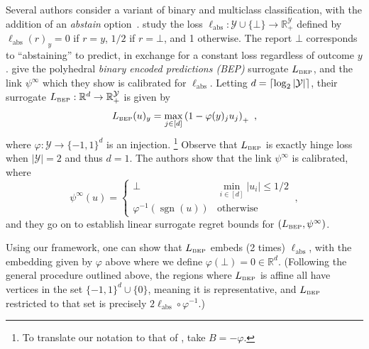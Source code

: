 \documentclass[twoside,11pt]{article}
\newcommand{\reals}{\mathbb{R}}
\newcommand{\BEP}{L_{\text{\tiny BEP}}}
\newcommand{\ellabstain}{\ell_{\text{abs}}}
\newcommand{\Y}{\mathcal{Y}}
\DeclarePairedDelimiter\ceil{\lceil}{\rceil}
\DeclareMathOperator*{\sgn}{sgn}
\begin{document}
Several authors consider a variant of binary and multiclass classification, with the addition of an \emph{abstain} option~\citep{bartlett2008classification,ramaswamy2018consistent,madras2018predict,elyaniv2010foundations,cortes2016learning}.
\citet{ramaswamy2018consistent} study the loss $\ellabstain: \Y \cup \{\bot\} \to \reals^\Y_+$ defined by $\ellabstain(r)_y = 0$ if $r=y$, $1/2$ if $r = \bot$, and 1 otherwise.
The report $\bot$ corresponds to ``abstaining'' to predict, in exchange for a constant loss regardless of outcome $y$. 
\citeauthor{ramaswamy2018consistent} give the polyhedral \emph{binary encoded predictions (BEP)} surrogate $\BEP$, and the link $\psi^\infty$ which they show is calibrated for $\ellabstain$.
Letting $d = \ceil{\log_2 |\Y|}$, their surrogate $\BEP : \reals^d \to \reals^\Y_+$ is given by
\begin{equation}\label{eq:abstain-surrogate}
\BEP(u)_y = \max_{j \in [d]} \left(1 - \varphi(y)_j u_j\right)_+~,
\end{equation}
where $\varphi:\Y\to\{-1,1\}^d$ is an injection.%
\footnote{To translate our notation to that of \citet{ramaswamy2018consistent}, take $B = -\varphi$.}
Observe that $\BEP$ is exactly hinge loss when $|\Y|=2$ and thus $d=1$. 
The authors show that the link $\psi^{\infty}$ is calibrated, where
\begin{equation}\label{eq:abstain-link}
  \psi^{\infty}(u) = \begin{cases}
	\bot & \min_{i \in [d]} |u_i| \leq 1/2\\ %
	\varphi^{-1}(\sgn(u)) &\text{otherwise}
  \end{cases}~,
\end{equation}
and they go on to establish linear surrogate regret bounds for $(\BEP,\psi^{\infty})$.

Using our framework, one can show that $\BEP$ embeds (2 times) $\ellabstain$, with the embedding given by $\varphi$ above where we define $\varphi(\bot) = 0 \in \reals^d$.
(Following the general procedure outlined above, the regions where $\BEP$ is affine all have vertices in the set $\{-1,1\}^d \cup \{0\}$, meaning it is representative, and $\BEP$ restricted to that set is precisely $2\ellabstain \circ \varphi^{-1}$.)
\end{document}
